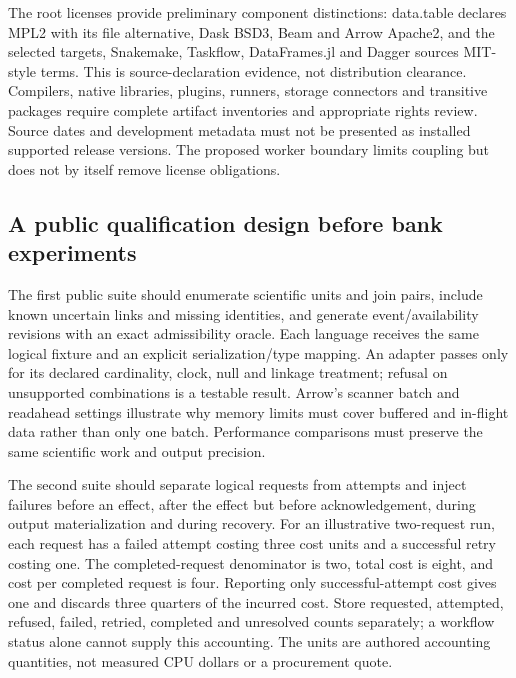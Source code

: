 The root licenses provide preliminary component distinctions: data.table declares MPL2 with its file alternative, Dask BSD3, Beam and Arrow Apache2, and the selected targets, Snakemake, Taskflow, DataFrames.jl and Dagger sources MIT-style terms. This is source-declaration evidence, not distribution clearance. Compilers, native libraries, plugins, runners, storage connectors and transitive packages require complete artifact inventories and appropriate rights review. Source dates and development metadata must not be presented as installed supported release versions. The proposed worker boundary limits coupling but does not by itself remove license obligations.~\citep{exec25_dww_datatable,exec25_dww_targets,exec25_dww_dask,exec25_dww_snakemake,exec25_dww_beam,exec25_dww_arrow,exec25_dww_taskflow,exec25_dww_dataframes,exec25_dww_dagger}

\subsection{A public qualification design before bank experiments}

The first public suite should enumerate scientific units and join pairs, include known uncertain links and missing identities, and generate event/availability revisions with an exact admissibility oracle. Each language receives the same logical fixture and an explicit serialization/type mapping. An adapter passes only for its declared cardinality, clock, null and linkage treatment; refusal on unsupported combinations is a testable result. Arrow's scanner batch and readahead settings illustrate why memory limits must cover buffered and in-flight data rather than only one batch. Performance comparisons must preserve the same scientific work and output precision.~\citep{exec25_dww_arrow,exec25_dww_choice}

The second suite should separate logical requests from attempts and inject failures before an effect, after the effect but before acknowledgement, during output materialization and during recovery. For an illustrative two-request run, each request has a failed attempt costing three cost units and a successful retry costing one. The completed-request denominator is two, total cost is eight, and cost per completed request is four. Reporting only successful-attempt cost gives one and discards three quarters of the incurred cost. Store requested, attempted, refused, failed, retried, completed and unresolved counts separately; a workflow status alone cannot supply this accounting. The units are authored accounting quantities, not measured CPU dollars or a procurement quote.~\citep{exec25_dww_choice}

